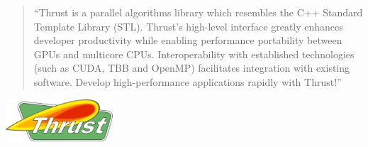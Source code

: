 \begin{frame}[fragile]


\vspace{4ex}
\begin{quotation}
``Thrust is a parallel algorithms library which resembles the C++ Standard Template Library (STL). Thrust's high-level interface greatly enhances developer productivity while enabling performance portability between GPUs and multicore CPUs. Interoperability with established technologies (such as CUDA, TBB and OpenMP) facilitates integration with existing software. Develop high-performance applications rapidly with Thrust!''
\end{quotation}

\vspace{2ex}

\centerline{\includegraphics[draft=false,width=0.3\textwidth]{thrust_logo.png}}
 

\end{frame}







